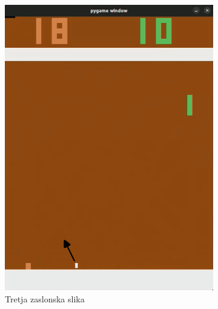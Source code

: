 \documentclass[cover]{thesis}
\begin{document}
\begin{figure}[H]
\begin{subfigure}{0.495\linewidth}
        \includegraphics[width=\textwidth]{SecondHit.png}
        \caption{Tretja zaslonska slika}\label{fig:secondHit}
    \end{subfigure}
    \begin{subfigure}{0.495\linewidth}
        \centering

\end{subfigure}
\end{figure}
\end{document}
